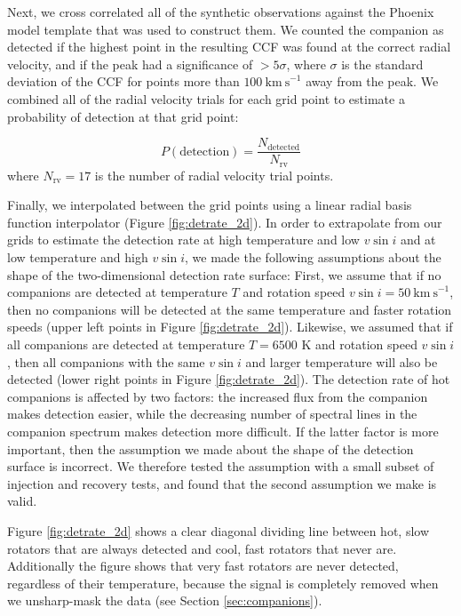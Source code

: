 \documentclass{emulateapj}
\begin{document}
Next, we cross correlated all of the synthetic observations against the Phoenix model template that was used to construct them. We counted the companion as detected if the highest point in the resulting CCF was found at the correct radial velocity, and if the peak had a significance of $>5\sigma$, where $\sigma$ is the standard deviation of the CCF for points more than $100\ \mathrm{km\ s}^{-1}$ away from the peak. We combined all of the radial velocity trials for each grid point to estimate a probability of detection at that grid point:

\begin{equation}
P(\mathrm{detection}) = \frac{N_\mathrm{detected}}{N_\mathrm{rv}}
\end{equation}
where $N_\mathrm{rv} = 17$ is the number of radial velocity trial points. 

Finally, we interpolated between the grid points using a linear radial basis function interpolator (Figure \ref{fig:detrate_2d}). In order to extrapolate from our grids to estimate the detection rate at high temperature and low $v\sin{i}$ and at low temperature and high $v\sin{i}$, we made the following assumptions about the shape of the two-dimensional detection rate surface: First, we assume that if no companions are detected at temperature $T$ and rotation speed $v\sin{i} = 50\ \mathrm{km\ s}^{-1}$, then no companions will be detected at the same temperature and faster rotation speeds (upper left points in Figure \ref{fig:detrate_2d}). Likewise, we assumed that if all companions are detected at temperature $T=6500$ K and rotation speed $v\sin{i}$, then all companions with the same $v\sin{i}$ and larger temperature will also be detected (lower right points in Figure \ref{fig:detrate_2d}). The detection rate of hot companions is affected by two factors: the increased flux from the companion makes detection easier, while the decreasing number of spectral lines in the companion spectrum makes detection more difficult. If the latter factor is more important, then the assumption we made about the shape of the detection surface is incorrect. We therefore tested the assumption with a small subset of injection and recovery tests, and found that the second assumption we make is valid.


Figure \ref{fig:detrate_2d} shows a clear diagonal dividing line between hot, slow rotators that are always detected and cool, fast rotators that never are. Additionally the figure shows that very fast rotators are never detected, regardless of their temperature, because the signal is completely removed when we unsharp-mask the data (see Section \ref{sec:companions}).
\end{document}
